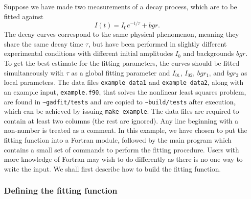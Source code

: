 \documentclass{article}
\begin{document}
Suppose we have made two measurements of a decay process, which are to
be fitted against
\begin{equation}
  \label{eq:exp_decay}
  I(t) = I_0e^{-t/\tau} + bgr.
\end{equation}
The decay curves correspond to the same physical phenomenon, meaning
they share the same decay time $\tau$, but have been performed in
slightly different experimental conditions with different initial
amplitudes $I_0$ and backgrounds $bgr$. To get the best estimate for
the fitting parameters, the curves should be fitted simultaneously
with $\tau$ as a global fitting parameter and $I_{01}$, $I_{02}$,
$bgr_1$, and $bgr_2$ as local parameters. The data files
\verb+example_data1+ and \verb+example_data2+, along with an example
input, \verb+example.f90+, that solves the nonlinear least squares
problem, are found in \verb+~gadfit/tests+ and are copied to
\verb+~build/tests+ after execution, which can be achieved by issuing
\texttt{make example}. The data files are required to contain at least
two columns (the rest are ignored). Any line beginning with a
non-number is treated as a comment. In this example, we have chosen to
put the fitting function into a Fortran module, followed by the main
program which contains a small set of commands to perform the fitting
procedure. Users with more knowledge of Fortran may wish to do
differently as there is no one way to write the input. We shall first
describe how to build the fitting function.

\subsubsection{Defining the fitting function}
\end{document}
